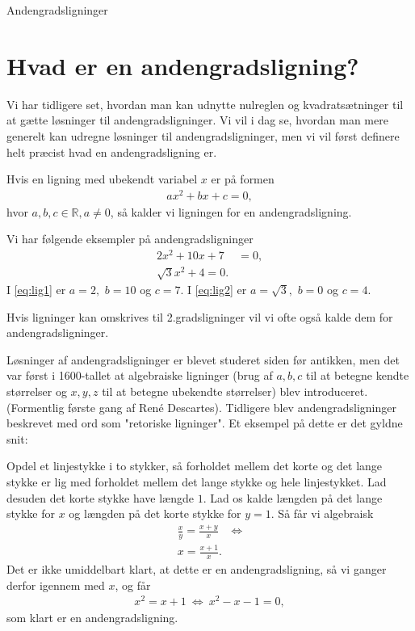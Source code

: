 \begin{center}
\Huge
Andengradsligninger
\end{center}

\section*{Hvad er en andengradsligning?}

Vi har tidligere set, hvordan man kan udnytte nulreglen og kvadratsætninger til at gætte løsninger til andengradsligninger. Vi vil i dag se, hvordan man mere generelt kan udregne løsninger til andengradsligninger, men vi vil først definere helt præcist hvad en andengradsligning er.
\begin{defn}[andengradsligning]
Hvis en ligning med ubekendt variabel $x$ er på formen 
\begin{align*}
ax^2+bx+c=0,
\end{align*}
hvor $a,b,c\in \mathbb{R}, a\neq 0$, så kalder vi ligningen for en andengradsligning. 
\end{defn}

\begin{exa}
Vi har følgende eksempler på andengradsligninger
\begin{align}
2x^2+10x+7&=0\label{eq:lig1},\\
\sqrt{3}x^2+4=0\label{eq:lig2}.
\end{align}
I \eqref{eq:lig1} er $a=2,$ $b=10$ og $c=7$. I \eqref{eq:lig2} er $a=\sqrt{3},$ $b=0$ og $c=4$. 
\end{exa}
Hvis ligninger kan omskrives til 2.gradsligninger vil vi ofte også kalde dem for andengradsligninger.
\begin{exa}
Løsninger af andengradsligninger er blevet studeret siden før antikken, men det var først i 1600-tallet at algebraiske ligninger (brug af $a,b,c$ til at betegne kendte størrelser og $x,y,z$ til at betegne ubekendte størrelser) blev introduceret. (Formentlig første gang af René Descartes). Tidligere blev andengradsligninger beskrevet med ord som "retoriske ligninger". Et eksempel på dette er det gyldne snit:

Opdel et linjestykke i to stykker, så forholdet mellem det korte og det lange stykke er lig med forholdet mellem det lange stykke og hele linjestykket. Lad desuden det korte stykke have længde $1$. Lad os kalde længden på det lange stykke for $x$ og længden på det korte stykke for $y=1$. Så får vi algebraisk
\begin{align*}
 \frac{x}{y} = \frac{x+y}{x} &\Leftrightarrow\\
 x = \frac{x+1}{x}.
\end{align*}
Det er ikke umiddelbart klart, at dette er en andengradsligning, så vi ganger derfor igennem med $x$, og får
\begin{align*}
x^2 = x+1\  \Leftrightarrow\ x^2-x-1=0,
\end{align*}
som klart er en andengradsligning.
\end{exa}
